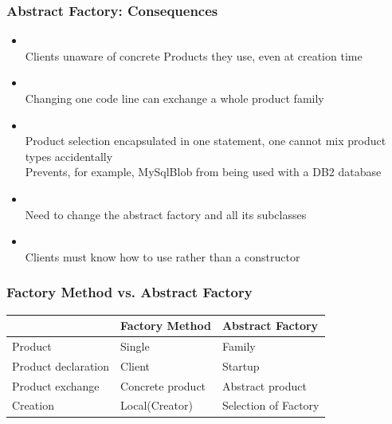 \subsubsection{Abstract Factory: Consequences}
\begin{itemize}
    \item {}\\
    Clients unaware of concrete Products they use, even at creation time
    \item {}\\
    Changing one code line can exchange a whole product family
    \item {}\\
    Product selection encapsulated in one statement, one cannot mix product types accidentally\\
    Prevents, for example, MySqlBlob from being used with a DB2 database
    \item {}\\
    Need to change the abstract factory and all its subclasses
    \item {}\\
    Clients must know how to use  rather than a constructor
\end{itemize}
\subsubsection{Factory Method vs. Abstract Factory}
\begin{table}[H]
    \centering
    \renewcommand{\arraystretch}{1.2}
    \begin{tabular}{lll}
        \toprule
        & Factory Method & Abstract Factory \\
        \midrule
        Product & Single & Family\\
        Product declaration & Client & Startup \\
        Product exchange & Concrete product & Abstract product\\
        Creation & Local(Creator) & Selection of Factory\\
        \bottomrule
    \end{tabular}
\end{table}
